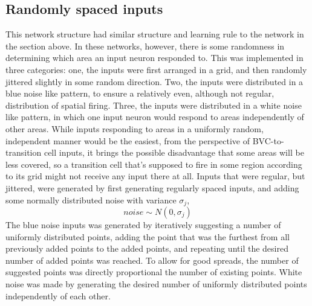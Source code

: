 \documentclass{article}
\begin{document}
    \subsection{Randomly spaced inputs}
    This network structure had similar structure and learning rule to the network in the section above. In these networks, however, there is some randomness in determining which area an input neuron responded to. This was implemented in three categories: one, the inputs were first arranged in a grid, and then randomly jittered slightly in some random direction. Two, the inputs were distributed in a blue noise like pattern, to ensure a relatively even, although not regular, distribution of spatial firing. Three, the inputs were distributed in a white noise like pattern, in which one input neuron would respond to areas independently of other areas.
    While inputs responding to areas in a uniformly random, independent manner would be the easiest, from the perspective of BVC-to-transition cell inputs, it brings the possible disadvantage that some areas will be less covered, so a transition cell that's supposed to fire in some region according to its grid might not receive any input there at all.
    Inputs that were regular, but jittered, were generated by first generating regularly spaced inputs, and adding some normally distributed noise with variance \(\sigma_j\), \[noise \sim N(0, \sigma_j)\]
    The blue noise inputs was generated by iteratively suggesting a number of uniformly distributed points, adding the point that was the furthest from all previously added points to the added points, and repeating until the desired number of added points was reached. To allow for good spreads, the number of suggested points was directly proportional the number of existing points.
    White noise was made by generating the desired number of uniformly distributed points independently of each other.
\end{document}

